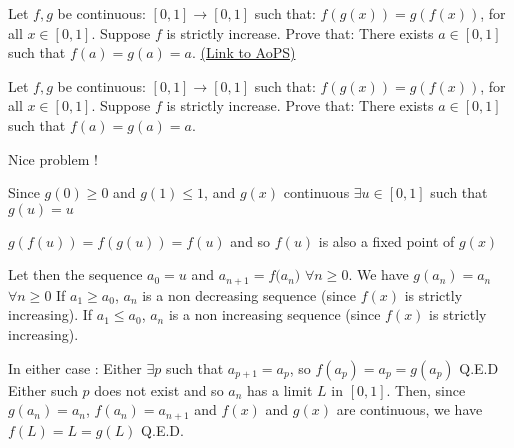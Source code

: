 \begin{problem}
	Let $ f,g$ be continuous: $ [0,1]\longrightarrow [0,1]$ such that: 
$ f(g(x))=g(f(x))$, for all $ x\in [0,1]$. Suppose $ f$ is strictly increase.
Prove that: There exists $ a\in [0,1]$ such that $ f(a)=g(a)=a$.
	\flushright \href{https://artofproblemsolving.com/community/c6h274551}{(Link to AoPS)}
\end{problem}



\begin{solution}
	\begin{tcolorbox}Let $ f,g$ be continuous: $ [0,1]\longrightarrow [0,1]$ such that: 
$ f(g(x)) = g(f(x))$, for all $ x\in [0,1]$. Suppose $ f$ is strictly increase.
Prove that: There exists $ a\in [0,1]$ such that $ f(a) = g(a) = a$.\end{tcolorbox}

Nice problem !

Since $ g(0)\geq 0$ and $ g(1)\leq 1$, and $ g(x)$ continuous $ \exists u\in[0,1]$ such that $ g(u)=u$

$ g(f(u))=f(g(u))=f(u)$ and so $ f(u)$ is also a fixed point of $ g(x)$

Let then the sequence $ a_0=u$ and ${ a_{n+1}=f(a_n})$ $ \forall n\geq 0$. We have $ g(a_n)=a_n$ $ \forall n\geq 0$
If $ a_1\geq a_0$, $ a_n$ is a non decreasing sequence (since $ f(x)$ is strictly increasing).
If $ a_1\leq a_0$, $ a_n$ is a non increasing sequence (since $ f(x)$ is strictly increasing).

In either case :
Either $ \exists p$ such that $ a_{p+1}=a_p$, so $ f(a_p)=a_p=g(a_p)$ Q.E.D
Either such $ p$ does not exist and so $ a_n$ has a limit $ L$ in $ [0,1]$. Then, since $ g(a_n)=a_n$, $ f(a_n)=a_{n+1}$ and $ f(x)$ and $ g(x)$ are continuous, we have $ f(L)=L=g(L)$ Q.E.D.
\end{solution}



